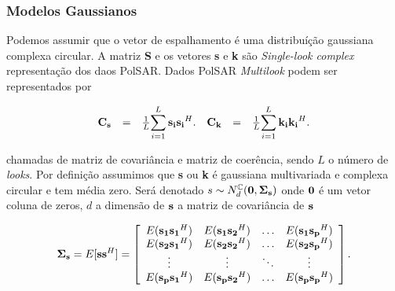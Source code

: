 \documentclass[10pt,a4paper]{article}
\begin{document}



\subsubsection{Modelos Gaussianos}


Podemos assumir que o vetor de espalhamento é uma distribuíção gaussiana complexa circular. A matriz {\bf S} e os vetores {\bf s} e {\bf k} são {\it Single-look complex} representação dos daos PolSAR. Dados PolSAR {\it Multilook} podem ser representados por
 
\begin{equation}\label{sec41eqn1}
\begin{array}{ccc}
	{\bf C_{\bf s}}&=&\frac{1}{L}\displaystyle{\sum_{i=1}^{L} {\bf s_i}{\bf s_i}^H} . \\
\end{array}
\begin{array}{ccc}
	{\bf C_{\bf k}}&=&\frac{1}{L}\displaystyle{\sum_{i=1}^{L} {\bf k_i}{\bf k_i}^H} . \\
\end{array}
\end{equation}

chamadas de matriz de covariância e matriz de coerência, sendo $L$ o número de {\it looks}. Por definição assumimos que {\bf s} ou {\bf k} é gaussiana multivariada e complexa circular e tem média zero. Será denotado $s\sim N_d^{\mathbb C}(\bf 0, \Sigma_{\bf s})$ onde $\bf 0$ é um vetor coluna de zeros, $d$ a dimensão de $\bf s$ a matriz de covariância de $\bf s$  

\begin{equation}\label{sec41eqn2}
	{\bf \Sigma_{{\bf s}}} = E[{\bf s}{\bf s}^H] =\left[
\begin{array}{cccc}
	E({\bf s_1}{\bf s_1}^H)  & E({\bf s_1}{\bf s_2}^H) &\hdots & E({\bf s_1}{\bf s_p}^H) \\
	E({\bf s_2}{\bf s_1}^H)  & E({\bf s_2}{\bf s_2}^H) &\hdots &E({\bf s_2}{\bf s_p}^H)\\
        \vdots&\vdots &\ddots &\vdots\\
	E({\bf s_p}{\bf s_1}^H)  & E({\bf s_p}{\bf s_2}^H) &\hdots &E({\bf s_p}{\bf s_p}^H)\\
\end{array}
\right].
\end{equation}
\end{document}
